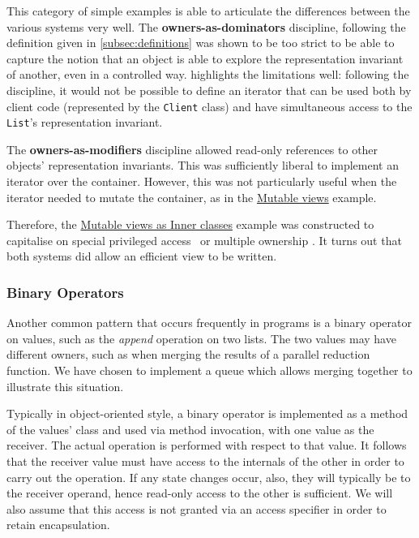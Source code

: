 \documentclass{acm_proc_article-sp}
\begin{document}
This category of simple examples is able to articulate the differences
between the various systems very well. The \textbf{owners-as-dominators}
discipline, following the definition given in \cref{subsec:definitions} was
shown to be too strict to be able to capture the notion that an object is able
to explore the representation invariant of another, even in a controlled way.
 highlights the limitations well: following the
discipline, it would not be possible to define an iterator that can be used
both by client code (represented by the \lstinline|Client| class) and have
simultaneous access to the \lstinline|List|'s representation invariant.

The \textbf{owners-as-modifiers} discipline allowed read-only references to
other objects' representation invariants. This was sufficiently liberal to
implement an iterator over the container. However, this was not particularly
useful when the iterator needed to mutate the container, as in the
\hyperref[item:mutable-views]{Mutable views} example.

Therefore, the \hyperref[item:mutable-views-as-inner-classes]{Mutable views as
Inner classes} example was constructed to capitalise on special privileged
access~\cite{boyapati04safejava} or multiple ownership \cite{cameron07mojo}. It
turns out that both systems did allow an efficient view to be written.


\subsubsection{Binary Operators}
\label{subsubsec:binary_ops}

Another common pattern that occurs frequently in programs is a binary operator
on values, such as the \textit{append} operation on two lists. The two values
may have different owners, such as when merging the results of a parallel
reduction function. We have chosen to implement a queue which allows merging
together to illustrate this situation.

Typically in object-oriented style, a binary operator is implemented as a method
of the values' class and used via method invocation, with one value as the
receiver. The actual operation is performed with respect to that value. It
follows that the receiver value must have access to the internals of the other
in order to carry out the operation. If any state changes occur, also, they will
typically be to the receiver operand, hence read-only access to the other is
sufficient. We will also assume that this access is not granted via an access
specifier in order to retain encapsulation.
\end{document}
